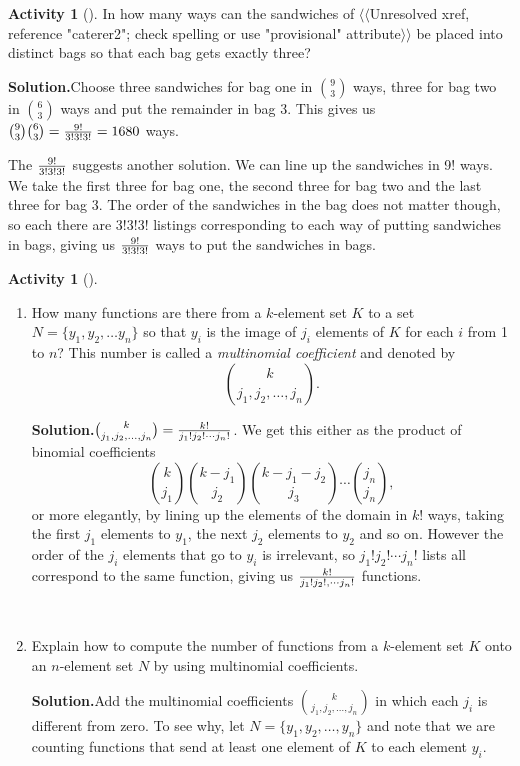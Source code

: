 \documentclass[10pt,]{book}
\theoremstyle{plain}
\theoremstyle{definition}
\newtheorem{activity}[project]{Activity}
\numberwithin{equation}{chapter}
\begin{document}
\begin{activity}[]\label{activity-41}
In how many ways can the sandwiches of {$\langle\langle$Unresolved xref, reference "caterer2"; check spelling or use "provisional" attribute$\rangle\rangle$} be placed into distinct bags so that each bag gets exactly three?%
\par\medskip\noindent%
\textbf{Solution.}\quad Choose three sandwiches for bag one in \(9\choose3\) ways, three for bag two in \(6\choose3\) ways and put the remainder in bag 3. This gives us \({9\choose3}{6\choose3}={9!\over3!3!3!}=1680\) ways.%
\par
The \(9!\over3!3!3!\) suggests another solution. We can line up the sandwiches in 9! ways. We take the first three for bag one, the second three for bag two and the last three for bag 3. The order of the sandwiches in the bag does not matter though, so each there are \(3!3!3!\) listings corresponding to each way of putting sandwiches in bags, giving us \(9!\over3!3!3!\) ways to put the sandwiches in bags.%
\end{activity}
\begin{activity}[]\label{activity-42}
~\par
\begin{enumerate}[label=(\alph*)]
 \item How many functions are there from a \(k\)-element set \(K\) to a set \(N=\{y_1,y_2,\ldots y_n\}\) so that \(y_i\) is the image of \(j_i\) elements of \(K\) for each \(i\) from 1 to \(n\)? This number is called a \emph{multinomial coefficient} and denoted by%
\begin{equation*}
{k\choose
j_1,j_2,\ldots, j_n}.
\end{equation*}
%
\par\medskip\noindent%
\textbf{Solution.}\quad \({k\choose j_1,j_2,\ldots, j_n} =
{k!\over j_1!j_2!\cdots j_n!}\). We get this either as the product of binomial coefficients%
\begin{equation*}
{k\choose j_1}{k-j_1\choose
j_2}{k-j_1-j_2\choose j_3}\cdots{j_n\choose j_n},
\end{equation*}
or more elegantly, by lining up the elements of the domain in \(k!\) ways, taking the first \(j_1\) elements to \(y_1\), the next \(j_2\) elements to \(y_2\) and so on. However the order of the \(j_i\) elements that go to \(y_i\) is irrelevant, so \(j_1!j_2!\cdots j_n!\) lists all correspond to the same function, giving us \(k!\over j_1!j_2!,\cdots j_n!\) functions.%

~\par
\item Explain how to compute the number of functions from a \(k\)-element set \(K\) onto an \(n\)-element set \(N\) by using multinomial coefficients.%
\par\medskip\noindent%
\textbf{Solution.}\quad Add the multinomial coefficients \(k\choose
j_1,j_2,\ldots,j_n\) in which each \(j_i\) is different from zero. To see why, let \(N=\{y_1,y_2,\ldots,y_n\}\) and note that we are counting functions that send at least one element of \(K\) to each element \(y_i\).%

\end{enumerate}
\end{activity}
\end{document}
